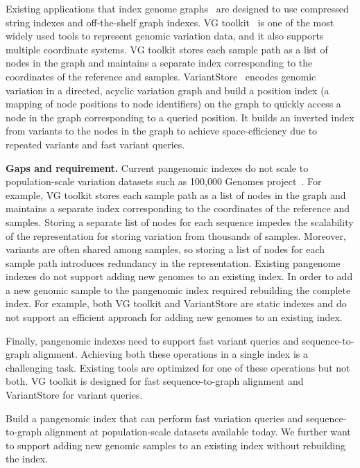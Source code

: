 Existing applications that index genome graphs~\cite{pandey2021variantstore,garrison2018variation} are designed to use compressed string indexes and off-the-shelf graph indexes. VG toolkit~\cite{garrison2018variation} is one of the most widely used tools to represent genomic variation data, and it also supports multiple coordinate systems. VG toolkit stores each sample path as a list of nodes in the graph and maintains a separate index corresponding to the coordinates of the reference and samples.
%
VariantStore~\cite{pandey2021variantstore}  encodes genomic variation in a directed, acyclic variation graph and build a position index (a mapping of node positions to node identifiers) on the graph to quickly access a node in the graph corresponding to a queried position. It builds an inverted index from variants to the nodes in the graph to achieve space-efficiency due to repeated variants and fast variant queries.

\noindent
\textbf{Gaps and requirement.}
Current pangenomic indexes do not scale to population-scale variation datasets such as 100,000 Genomes project~\cite{1002021100}. For example, VG toolkit stores each sample path as a list of nodes in the graph and maintains a separate index corresponding to the coordinates of the reference and samples. Storing a separate list of nodes for each sequence impedes the scalability of the representation for storing variation from thousands of samples. Moreover, variants are often shared among samples, so storing a list of nodes for each sample path introduces redundancy in the representation.
%
Existing pangenome indexes do not support adding new genomes to an existing index. In order to add a new genomic sample to the pangenomic index required rebuilding the complete index. For example, both VG toolkit and VariantStore are static indexes and do not support an efficient approach for adding new genomes to an existing index.

Finally, pangenomic indexes need to support fast variant queries and sequence-to-graph alignment. Achieving both these operations in a single index is a challenging task. Existing tools are optimized for one of these operations but not both. VG toolkit is designed for fast sequence-to-graph alignment and VariantStore for variant queries.


\begin{rproblem}
 Build a pangenomic index that can perform fast variation queries and sequence-to-graph alignment at population-scale datasets available today. We further want to support adding new genomic samples to an existing index without rebuilding the index.
\label{rprob:pangenomics}
\end{rproblem}

